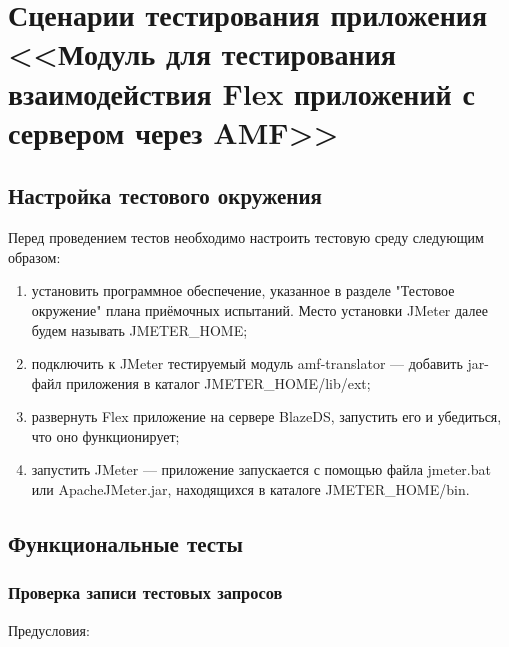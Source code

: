 \chapter{Сценарии тестирования приложения <<Модуль для тестирования взаимодействия Flex приложений с сервером через AMF>>}
\label{cha:appendix3}

\section{Настройка тестового окружения}

Перед проведением тестов необходимо настроить тестовую среду следующим образом:

\begin{enumerate}
\item установить программное обеспечение, указанное в разделе "Тестовое окружение" плана приёмочных испытаний.
Место установки JMeter далее будем называть JMETER\_HOME;
\item подключить к JMeter тестируемый модуль amf-translator --- добавить jar-файл приложения в каталог
JMETER\_HOME/lib/ext;
\item развернуть Flex приложение на сервере BlazeDS, запустить его и убедиться, что оно функционирует;
\item запустить JMeter --- приложение запускается с помощью файла jmeter.bat или ApacheJMeter.jar, находящихся в
каталоге JMETER\_HOME/bin.
\end{enumerate}

\section{Функциональные тесты}

\subsection{Проверка записи тестовых запросов}

Предусловия:

